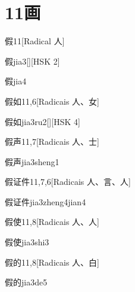 
\section*{11画}

\begin{entry}{假}{11}[Radical ⼈]
  \begin{phonetics}{假}{jia3}[][HSK 2]
  \end{phonetics}
  \begin{phonetics}{假}{jia4}
  \end{phonetics}
\end{entry}

\begin{entry}{假如}{11,6}[Radicais ⼈、⼥]
  \begin{phonetics}{假如}{jia3ru2}[][HSK 4]
  \end{phonetics}
\end{entry}

\begin{entry}{假声}{11,7}[Radicais ⼈、⼠]
  \begin{phonetics}{假声}{jia3sheng1}
  \end{phonetics}
\end{entry}

\begin{entry}{假证件}{11,7,6}[Radicais ⼈、⾔、⼈]
  \begin{phonetics}{假证件}{jia3zheng4jian4}
  \end{phonetics}
\end{entry}

\begin{entry}{假使}{11,8}[Radicais ⼈、⼈]
  \begin{phonetics}{假使}{jia3shi3}
  \end{phonetics}
\end{entry}

\begin{entry}{假的}{11,8}[Radicais ⼈、⽩]
  \begin{phonetics}{假的}{jia3de5}
  \end{phonetics}
\end{entry}


